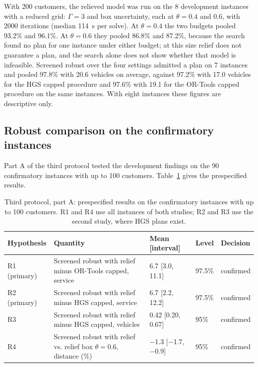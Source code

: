 With 200 customers, the relieved model was run on the 8 development instances with a reduced grid: $\Gamma=3$ and box uncertainty, each at $\theta=0.4$ and $0.6$, with 2000 iterations (median 114~s per solve). At $\theta=0.4$ the two budgets pooled 93.2\% and 96.1\%. At $\theta=0.6$ they pooled 86.8\% and 87.2\%, because the search found no plan for one instance under either budget; at this size relief does not guarantee a plan, and the search alone does not show whether that model is infeasible. Screened robust over the four settings admitted a plan on 7 instances and pooled 97.8\% with 20.6 vehicles on average, against 97.2\% with 17.0 vehicles for the HGS capped procedure and 97.6\% with 19.1 for the OR-Tools capped procedure on the same instances. With eight instances these figures are descriptive only.

\subsection{Robust comparison on the confirmatory instances}\label{sec:parta}

Part A of the third protocol \cite{ali2026freeze3} tested the development findings on the 90 confirmatory instances with up to 100 customers. Table~\ref{tab:parta} gives the prespecified results.

\begin{table}[htbp]
\centering
\footnotesize
\setlength{\tabcolsep}{4pt}
\caption{Third protocol, part A: prespecified results on the confirmatory instances with up to 100 customers. R1 and R4 use all instances of both studies; R2 and R3 use the second study, where HGS plans exist.}
\label{tab:parta}
\begin{tabular}{@{}l>{\raggedright\arraybackslash}p{5.6cm}lll@{}}
\toprule
Hypothesis & Quantity & Mean [interval] & Level & Decision\\
\midrule
R1 (primary) & Screened robust with relief minus OR-Tools capped, service & 6.7 [3.0, 11.1] & 97.5\% & confirmed\\
R2 (primary) & Screened robust with relief minus HGS capped, service & 6.7 [2.2, 12.2] & 97.5\% & confirmed\\
R3 & Screened robust with relief minus HGS capped, vehicles & 0.42 [0.20, 0.67] & 95\% & confirmed\\
R4 & Screened robust with relief vs. relief box $\theta=0.6$, distance (\%) & $-$1.3 [$-$1.7, $-$0.9] & 95\% & confirmed\\
\bottomrule
\end{tabular}
\end{table}

